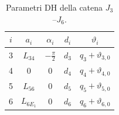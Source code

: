 \begin{table}[htbp]
    \centering
    \renewcommand{\arraystretch}{1.1}
    \begin{tabular}{|c|c|c|c|c|}
        \hline 
        $i$&$a_i$&$\alpha_i$&$d_i$&$\vartheta_i$\\ \hline \hline
        3&$L_{34}$&$-\frac\pi2$&$d_3$&$q_3+\vartheta_{3,0}$\\
        4&0&0&$d_4$&$q_4+\vartheta_{4,0}$\\
        5&$L_{56}$&$0$&$d_5$&$q_5+\vartheta_{5,0}$\\
        6&$L_{6E_1}$&$0$&$d_6$&$q_6+\vartheta_{6,0}$\\ \hline
    \end{tabular}
    \caption{Parametri DH della catena $J_3$--$J_6$.}
    \label{tab:dh_3_6}
\end{table}

